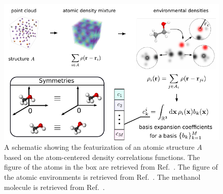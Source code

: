 \begin{figure}
  \centering
  \includegraphics[width=\textwidth]{fig/atomistic_repr_schematic.pdf}
  \caption{A schematic showing the featurization of an atomic structure $A$ based on the atom-centered density correlations functions. The figure of the atoms in the box are retrieved from Ref.~\cite{noh2019inverse}. The figure of the atomic environments is retrieved from Ref.~\cite{will+19jcp}. The methanol molecule is retrieved from Ref.~\cite{wiki:Alcohol_(chemistry)}.}
  \label{fig:acdc-scheme}
\end{figure}



